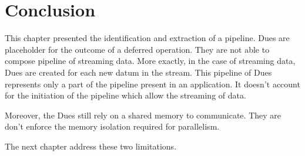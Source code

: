 








\section{Conclusion}

This chapter presented the identification and extraction of a pipeline.
Dues are placeholder for the outcome of a deferred operation.
They are not able to compose pipeline of streaming data.
More exactly, in the case of streaming data, Dues are created for each new datum in the stream.
This pipeline of Dues represents only a part of the pipeline present in an application.
It doesn't account for the initiation of the pipeline which allow the streaming of data.

Moreover, the Dues still rely on a shared memory to communicate.
They are don't enforce the memory isolation required for parallelism.

The next chapter address these two limitations.